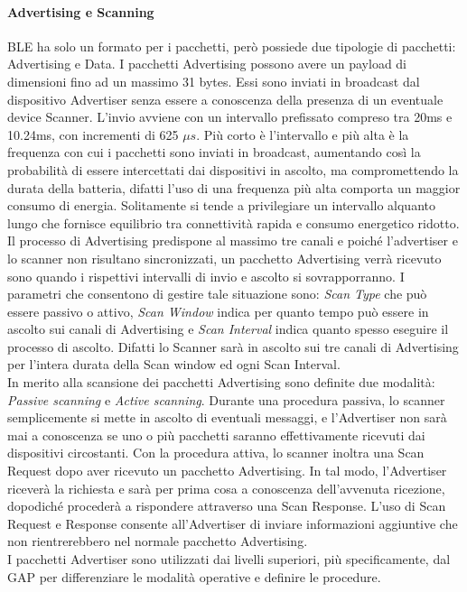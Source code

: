 \paragraph{Advertising e Scanning}
BLE ha solo un formato per i pacchetti, però possiede due tipologie di pacchetti: Advertising e Data. 
I pacchetti Advertising possono avere un payload di dimensioni fino ad un massimo 31 bytes. Essi sono inviati in broadcast dal dispositivo Advertiser senza essere a conoscenza della presenza di un eventuale device Scanner. L'invio avviene con un intervallo prefissato compreso tra 20ms e 10.24ms, con incrementi di 625 $\mu s$. Più corto è l'intervallo e più alta è la frequenza con cui i pacchetti sono inviati in broadcast, aumentando così la probabilità di essere intercettati dai dispositivi in ascolto, ma compromettendo la durata della batteria, difatti l'uso di una frequenza più alta comporta un maggior consumo di energia. Solitamente si tende a privilegiare un intervallo alquanto lungo che fornisce equilibrio tra connettività rapida e consumo energetico ridotto.\\
Il processo di Advertising predispone al massimo tre canali e poiché l'advertiser e lo scanner non risultano sincronizzati, un pacchetto Advertising verrà ricevuto sono quando i rispettivi intervalli di invio e ascolto si sovrapporranno. I parametri che consentono di gestire tale situazione sono: \textit{Scan Type} che può essere passivo o attivo, \textit{Scan Window} indica per quanto tempo può essere in ascolto sui canali di Advertising e \textit{Scan Interval} indica quanto spesso eseguire il processo di ascolto. Difatti lo Scanner sarà in ascolto sui tre canali di Advertising per l'intera durata della Scan window ed ogni Scan Interval.\\ 
In merito alla scansione dei pacchetti Advertising sono definite due modalità: \textit{Passive scanning} e \textit{Active scanning}.
Durante una procedura passiva, lo scanner semplicemente si mette in ascolto di eventuali messaggi, e l'Advertiser non sarà mai a conoscenza se uno o più pacchetti saranno effettivamente ricevuti dai dispositivi circostanti.
Con la procedura attiva, lo scanner inoltra una Scan Request dopo aver ricevuto un pacchetto Advertising. In tal modo, l'Advertiser riceverà la richiesta e sarà per prima cosa a conoscenza dell'avvenuta ricezione, dopodiché procederà a rispondere attraverso una Scan Response. L'uso di Scan Request e Response consente all'Advertiser di inviare informazioni aggiuntive che non rientrerebbero nel normale pacchetto Advertising. \\
I pacchetti Advertiser sono utilizzati dai livelli superiori, più specificamente, dal GAP per differenziare le modalità operative e definire le procedure.

